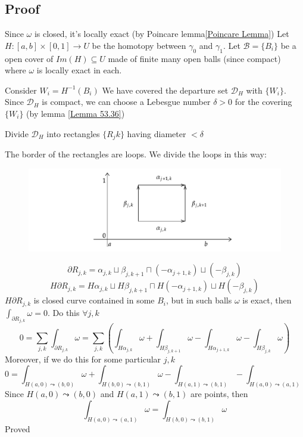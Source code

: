 \documentclass{book}
\begin{document}
\subsection*{Proof}
Since $\omega$ is closed, it's locally exact (by Poincare lemma\ref{Poincare Lemma}) Let $H:[a,b]\times[0,1]\rightarrow U$ be the homotopy between $\gamma_0$ and $\gamma_1$. Let $\mathscr{B}=\{B_i\}$ be a open cover of $Im(H)\subseteq U$ made of finite many open balls (since compact) where $\omega$ is locally exact in each. 

Consider $W_i=H^{-1}(B_i)$ We have covered the departure set $\mathscr{D}_H$ with $\{W_i\}$. Since $\mathscr{D}_H$ is compact, we can choose a Lebesgue number $\delta>0$ for the covering $\{W_i\}$ (by lemma \ref{Lemma 53.36})

Divide $\mathscr{D}_H$ into rectangles $\{R_jk\}$ having diameter $<\delta$

The border of the rectangles are loops. We divide the loops in this way:
\begin{figure}[h]
    \centering
    \includegraphics[width=\textwidth]{img/2.pdf}
\end{figure}
$$\partial R_{j,k}=\alpha_{j,k}\sqcup\beta_{j,k+1}\sqcap(-\alpha_{j+1,k})\sqcup(-\beta_{j,k})$$
$$H\partial R_{j,k}= H\alpha_{j,k}\sqcup H\beta_{j,k+1}\sqcap H(-\alpha_{j+1,k})\sqcup H(-\beta_{j,k})$$
$H\partial R_{j,k}$ is closed curve contained in some $B_i$, but in such balls $\omega$ is exact, then $\int_{\partial R_{j,k}}\omega=0$. Do this $\forall j,k$
$$0=\sum\limits_{j,k}\int_{\partial R_{j,k}}\omega=\sum\limits_{j,k}\left(\int_{H\alpha_{j,k}}\omega+\int_{H\beta_{j,k+1}}\omega-\int_{H\alpha_{j+1,k}}\omega-\int_{H\beta_{j,k}}\omega\right)$$
Moreover, if we do this for some particular $j,k$
$$0=\int_{H(a,0)\leadsto(b,0) }\omega+\int_{H(b,0)\leadsto(b,1)}\omega-\int_{H(a,1)\leadsto(b,1)}-\int_{H(a,0)\leadsto(a,1)}$$
Since $H(a,0)\leadsto(b,0)$ and $H(a,1)\leadsto(b,1)$ are points, then 
$$\int_{H(a,0)\leadsto(a,1)}\omega=\int_{H(b,0)\leadsto(b,1)}\omega$$
Proved
\end{document}

